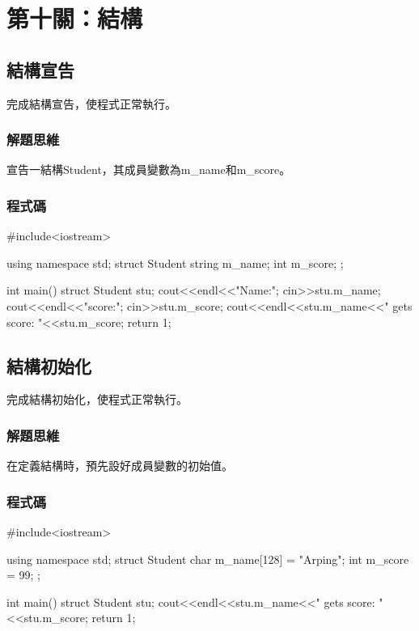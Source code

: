 \chapter{第十關：結構}

\section{結構宣告}
完成結構宣告，使程式正常執行。

\subsection{解題思維}

宣告一結構Student，其成員變數為m\_name和m\_score。

\subsection{程式碼}
\begin{cppcode}
	#include<iostream>
	
	using namespace std;
	struct Student {
		string m_name;
		int m_score;
	};
	
	int main() 
	{
		struct Student stu;
		cout<<endl<<"Name:";
		cin>>stu.m_name;
		cout<<endl<<"score:";
		cin>>stu.m_score;
		cout<<endl<<stu.m_name<<" gets score: "<<stu.m_score;
		return 1;
	}
\end{cppcode}

\section{結構初始化}
完成結構初始化，使程式正常執行。

\subsection{解題思維}

在定義結構時，預先設好成員變數的初始值。

\subsection{程式碼}
\begin{cppcode}
	#include<iostream>
	
	using namespace std;
	struct Student {
		char m_name[128] = "Arping";
		int m_score = 99;
	};
	
	int main() 
	{
		struct Student stu;
		cout<<endl<<stu.m_name<<" gets score: "<<stu.m_score;
		return 1;
	}
\end{cppcode}

